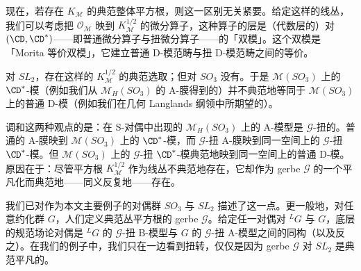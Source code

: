 现在，若存在 $K_{\mathcal{M}}$ 的典范整体平方根，则这一区别无关紧要。给定这样的线丛，我们可以考虑把 $\mathcal{O}_{\mathcal{M}}$ 映到 $K_{\mathcal{M}}^{1/2}$ 的微分算子，这种算子的层是（代数层的）对 $(\CD,\CD^*)$——即普通微分算子与扭微分算子——的「双模」。这个双模是「Morita 等价双模」，它建立普通 D-模范畴与扭 D-模范畴之间的等价。

对 $SL_2$，存在这样的 $K_{\mathcal{M}}^{1/2}$ 的典范选取；但对 $SO_3$ 没有。于是 $\mathcal{M}(SO_3)$ 上的 $\CD^*$-模（例如我们从 $\mathcal{M}_H(SO_3)$ 的 A-膜得到的）并不典范地等同于 $\mathcal{M}(SO_3)$ 上的普通 D-模（例如我们在几何 Langlands 纲领中所期望的）。

调和这两种观点的是：在 S-对偶中出现的 $\mathcal{M}_H(SO_3)$ 上的 A-模型是 $\mathcal{G}$-扭的。普通的 A-膜映到 $\mathcal{M}(SO_3)$ 上的 $\CD^*$-模，而 $\mathcal{G}$-扭 A-膜映到同一空间上的 $\mathcal{G}$-扭 $\CD^*$-模。但 $\mathcal{M}(SO_3)$ 上的 $\mathcal{G}$-扭 $\CD^*$-模典范地映到同一空间上的普通 D-模。原因在于：尽管平方根 $K_{\mathcal{M}}^{1/2}$ 作为线丛不典范地存在，它却作为 gerbe $\mathcal{G}$ 的一个平凡化而典范地——同义反复地——存在。


我们已对作为本文主要例子的对偶群 $SO_3$ 与 $SL_2$ 描述了这一点。更一般地，对任意约化群 $G$，人们定义典范丛平方根的 gerbe $\mathcal{G}$。给定任一对偶对 ${}^{L}G$ 与 $G$，底层的规范场论对偶是 ${}^{L}G$ 的 $\mathcal{G}$-扭 B-模型与 $G$ 的 $\mathcal{G}$-扭 A-模型之间的同构（以及反之）。在我们的例子中，我们只在一边看到扭转，仅仅是因为 gerbe $\mathcal{G}$ 对 $SL_2$ 是典范平凡的。

